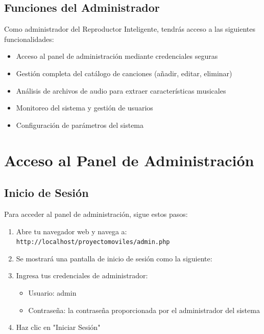 \documentclass[a4paper,12pt]{article}
\begin{document}
\subsection{Funciones del Administrador}
Como administrador del Reproductor Inteligente, tendrás acceso a las siguientes funcionalidades:
\begin{itemize}
  \item Acceso al panel de administración mediante credenciales seguras
  \item Gestión completa del catálogo de canciones (añadir, editar, eliminar)
  \item Análisis de archivos de audio para extraer características musicales
  \item Monitoreo del sistema y gestión de usuarios
  \item Configuración de parámetros del sistema
\end{itemize}

\section{Acceso al Panel de Administración}
\subsection{Inicio de Sesión}
Para acceder al panel de administración, sigue estos pasos:
\begin{enumerate}
  \item Abre tu navegador web y navega a: \texttt{http://localhost/proyectomoviles/admin.php}
  \item Se mostrará una pantalla de inicio de sesión como la siguiente:
  \begin{center}
  \end{center}
  \item Ingresa tus credenciales de administrador:
  \begin{itemize}
    \item Usuario: admin
    \item Contraseña: la contraseña proporcionada por el administrador del sistema
  \end{itemize}
  \item Haz clic en "Iniciar Sesión"
\end{enumerate}
\end{document}
